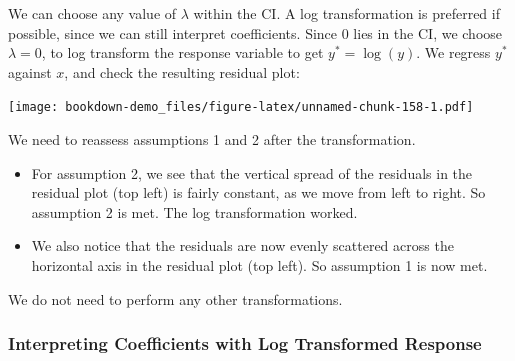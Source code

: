 \documentclass[
]{book}
\newenvironment{Shaded}{\begin{snugshade}}{\end{snugshade}}
\newcommand{\AttributeTok}[1]{\textcolor[rgb]{0.13,0.29,0.53}{#1}}
\newcommand{\DecValTok}[1]{\textcolor[rgb]{0.00,0.00,0.81}{#1}}
\newcommand{\DocumentationTok}[1]{\textcolor[rgb]{0.56,0.35,0.01}{\textbf{\textit{#1}}}}
\newcommand{\FunctionTok}[1]{\textcolor[rgb]{0.13,0.29,0.53}{\textbf{#1}}}
\newcommand{\NormalTok}[1]{#1}
\newcommand{\OtherTok}[1]{\textcolor[rgb]{0.56,0.35,0.01}{#1}}
\newcommand{\SpecialCharTok}[1]{\textcolor[rgb]{0.81,0.36,0.00}{\textbf{#1}}}
\begin{document}
We can choose any value of \(\lambda\) within the CI. A log transformation is preferred if possible, since we can still interpret coefficients. Since 0 lies in the CI, we choose \(\lambda = 0\), to log transform the response variable to get \(y^* = \log(y)\). We regress \(y^*\) against \(x\), and check the resulting residual plot:

\begin{Shaded}
\end{Shaded}

\texttt{[image: bookdown-demo\_files/figure-latex/unnamed-chunk-158-1.pdf]}

We need to reassess assumptions 1 and 2 after the transformation.

\begin{itemize}
\item
  For assumption 2, we see that the vertical spread of the residuals in the residual plot (top left) is fairly constant, as we move from left to right. So assumption 2 is met. The log transformation worked.
\item
  We also notice that the residuals are now evenly scattered across the horizontal axis in the residual plot (top left). So assumption 1 is now met.
\end{itemize}

We do not need to perform any other transformations.

\hypertarget{interpreting-coefficients-with-log-transformed-response}{%
\subsubsection*{Interpreting Coefficients with Log Transformed Response}\label{interpreting-coefficients-with-log-transformed-response}}
\end{document}

